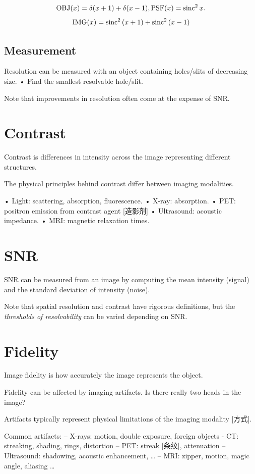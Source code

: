 \documentclass[UTF8,a4paper,11pt]{book}
\theoremstyle{mystyle}{
  \newtheorem{example}{Example}
}
\begin{document}
\begin{example}
\[
{\rm OBJ}(x)=\delta(x+1)+\delta(x-1),{\rm PSF}(x)={\rm sinc}^2\,x.
\]
\[
{\rm IMG}(x)={\rm sinc}^2\,(x+1) + {\rm sinc}^2\,(x-1)
\]
\end{example}

\subsection{Measurement}
Resolution can be measured with an object
containing holes/slits of decreasing size.
• Find the smallest resolvable hole/slit.

Note that improvements in resolution often
come at the expense of SNR.

\section{Contrast}
 Contrast is differences in intensity across the
image representing different structures.

 The physical principles behind contrast differ
between imaging modalities.

• Light: scattering, absorption, fluorescence.
• X-ray: absorption.
• PET: positron emission from contrast agent [造影剂]
• Ultrasound: acoustic impedance.
• MRI: magnetic relaxation times.

\section{SNR} %

SNR can be measured from an image by
computing the mean intensity (signal) and the
standard deviation of intensity (noise).

 Note that spatial resolution and contrast have
rigorous definitions, but the \emph{thresholds of
resolvability} can be varied depending on SNR.

\section{Fidelity}
Image fidelity is how accurately the image
represents the object.

 Fidelity can be affected by imaging artifacts.
 Is there really two heads in the image?

 Artifacts typically represent physical
limitations of the imaging modality [方式].

Common artifacts:
– X-rays: motion, double exposure, foreign objects
-  CT: streaking, shading, rings, distortion
– PET: streak [条纹], attenuation
– Ultrasound: shadowing, acoustic enhancement, …
– MRI: zipper, motion, magic angle, aliasing …
\end{document}
